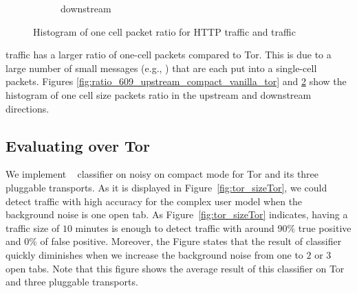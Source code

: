 \begin{figure}
\begin{subfigure}{0.48\linewidth}
\caption{downstream}
\label{fig:ratio_609_downstream_compact_vanilla_tor}
\end{subfigure}
\caption{Histogram of one cell packet ratio for HTTP traffic and \bc traffic}
\end{figure}
\bc traffic has a larger ratio of one-cell packets compared to Tor. This is due to a large number of small \bc messages (e.g., ) that are each put into a single-cell packets. Figures \ref{fig:ratio_609_upstream_compact_vanilla_tor} and \ref{fig:ratio_609_downstream_compact_vanilla_tor} show the histogram of one cell size packets ratio in the upstream and downstream directions.

 
\subsection{Evaluating \bc over Tor}
We implement ~ classifier on noisy \bc on compact mode for Tor and its three pluggable transports. As it is displayed in Figure~\ref{fig:tor_sizeTor}, we could detect \bc traffic with high accuracy for the complex user model when the background noise is one open tab. As Figure~\ref{fig:tor_sizeTor} indicates, having a traffic size of $10$ minutes is
enough to detect \bc traffic with around $90\%$ true positive and $0\%$ of false positive. Moreover, the Figure states that the result of classifier quickly diminishes when we increase the background noise from one to $2$ or $3$ open tabs.
Note that this figure shows the average result of this classifier on Tor and three pluggable transports.

